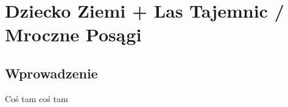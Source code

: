 \clearpage

\part{Dziecko Ziemi + Las Tajemnic / Mroczne Posągi}

\chapter{Wprowadzenie}

Coś tam coś tam
